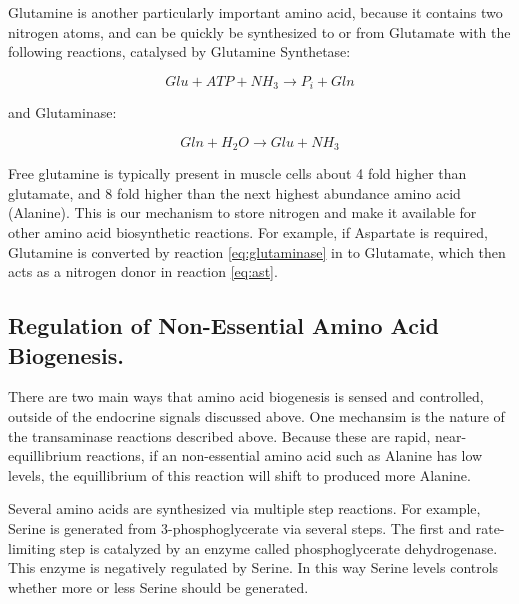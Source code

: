 \documentclass{tufte-handout}
\begin{document}
  Glutamine is another particularly important amino acid, because it contains two nitrogen atoms, and can be quickly be synthesized to or from Glutamate with the following reactions, catalysed by Glutamine Synthetase:

\begin{equation}
Glu + ATP +  NH_3 \rightarrow  P_i + Gln
\end{equation}

and Glutaminase:

\begin{equation}\label{eq:glutaminase} 
Gln + H_2O \rightarrow Glu + NH_3
\end{equation}

Free glutamine is typically present in muscle cells about 4 fold higher than glutamate, and 8 fold higher than the next highest abundance amino acid (Alanine).  This is our mechanism to store nitrogen and make it available for other amino acid biosynthetic reactions.  For example, if Aspartate is required, Glutamine is converted by reaction \ref{eq:glutaminase} in to Glutamate, which then acts as a nitrogen donor in reaction \ref{eq:ast}.

\subsection{Regulation of Non-Essential Amino Acid Biogenesis.}

There are two main ways that amino acid biogenesis is sensed and controlled, outside of the endocrine signals discussed above.  One mechansim is the nature of the transaminase reactions described above.  Because these are rapid, near-equillibrium reactions, if an non-essential amino acid such as Alanine has low levels, the equillibrium of this reaction will shift to produced more Alanine.

  Several amino acids are synthesized via multiple step reactions.  For example, Serine is generated from 3-phosphoglycerate via several steps.  The first and rate-limiting step is catalyzed by an enzyme called phosphoglycerate dehydrogenase.  This enzyme is negatively regulated by Serine.  In this way Serine levels controls whether more or less Serine should be generated.
\end{document}
